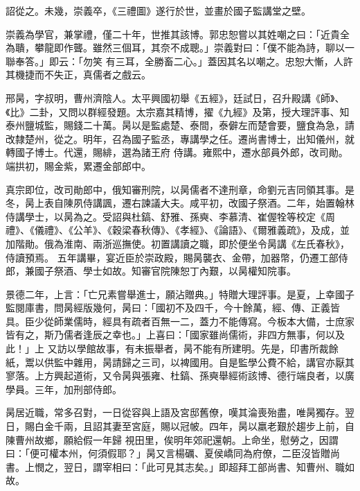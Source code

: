 \begin{pinyinscope}
 詔從之。未幾，崇義卒，《三禮圖》遂行於世，並畫於國子監講堂之壁。



 崇義為學官，兼掌禮，僅二十年，世推其該博。郭忠恕嘗以其姓嘲之曰：「近貴全為聵，攀龍即作聾。雖然三個耳，其奈不成聰。」崇義對曰：「僕不能為詩，聊以一聯奉答。」即云：「勿笑
 有三耳，全勝畜二心。」蓋因其名以嘲之。忠恕大慚，人許其機捷而不失正，真儒者之戲云。



 邢昺，字叔明，曹州濟陰人。太平興國初舉《五經》，廷試日，召升殿講《師》、《比》二卦，又問以群經發題。太宗嘉其精博，擢《九經》及第，授大理評事、知泰州鹽城監，賜錢二十萬。昺以是監處楚、泰間，泰僻左而楚會要，鹽食為急，請改隸楚州，從之。明年，召為國子監丞，專講學之任。遷尚書博士，出知儀州，就轉國子博士。代還，賜緋，選為諸王府
 侍講。雍熙中，遷水部員外郎，改司勛。端拱初，賜金紫，累遷金部郎中。



 真宗即位，改司勛郎中，俄知審刑院，以昺儒者不達刑章，命劉元吉同領其事。是冬，昺上表自陳夙侍講諷，遷右諫議大夫。咸平初，改國子祭酒。二年，始置翰林侍講學士，以昺為之。受詔與杜鎬、舒雅、孫奭、李慕清、崔偓牷等校定《周禮》、《儀禮》、《公羊》、《穀梁春秋傳》、《孝經》、《論語》、《爾雅義疏》，及成，並加階勛。俄為淮南、兩浙巡撫使。初置講讀之職，即於便坐令昺講《左氏春秋》，侍讀預焉。
 五年講畢，宴近臣於崇政殿，賜昺襲衣、金帶，加器幣，仍遷工部侍郎，兼國子祭酒、學士如故。知審官院陳恕丁內艱，以昺權知院事。



 景德二年，上言：「亡兄素嘗舉進士，願沾贈典。」特贈大理評事。是夏，上幸國子監閱庫書，問昺經版幾何，昺曰：「國初不及四千，今十餘萬，經、傳、正義皆具。臣少從師業儒時，經具有疏者百無一二，蓋力不能傳寫。今板本大備，士庶家皆有之，斯乃儒者逢辰之幸也。」上喜曰：「國家雖尚儒術，非四方無事，何以及此！」上
 又訪以學館故事，有未振舉者，昺不能有所建明。先是，印書所裁餘紙，鬻以供監中雜用，昺請歸之三司，以裨國用。自是監學公費不給，講官亦厭其寥落。上方興起道術，又令昺與張雍、杜鎬、孫奭舉經術該博、德行端良者，以廣學員。三年，加刑部侍郎。



 昺居近職，常多召對，一日從容與上語及宮邸舊僚，嘆其淪喪殆盡，唯昺獨存。翌日，賜白金千兩，且詔其妻至宮庭，賜以冠帔。四年，昺以羸老艱於趨步上前，自陳曹州故鄉，願給假一年歸
 視田里，俟明年郊祀還朝。上命坐，慰勞之，因謂曰：「便可權本州，何須假耶？」昺又言楊礪、夏侯嶠同為府僚，二臣沒皆贈尚書。上憫之，翌日，謂宰相曰：「此可見其志矣。」即超拜工部尚書、知曹州、職如故。




\end{pinyinscope}
